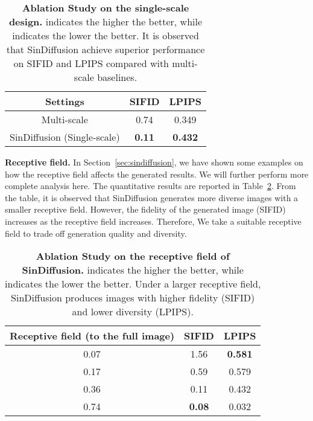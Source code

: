 \documentclass[10pt,twocolumn,letterpaper]{article}
\begin{document}
\begin{table}[t]
    \footnotesize
    \centering
    \begin{tabular}{c @{\hskip 14mm} c @{\hskip 14mm} c}
    \toprule
    \textbf{Settings} & \textbf{SIFID}  & \textbf{LPIPS}  \\
    \midrule
    {Multi-scale} & 0.74 & 0.349 \\
    {SinDiffusion (Single-scale)} & \textbf{0.11} & \textbf{0.432} \\
    \bottomrule
    \end{tabular}
    \vspace{-3mm}
    \caption{\textbf{Ablation Study on the single-scale design.}
     indicates the higher the better, while  indicates the lower the better.
    It is observed that SinDiffusion achieve superior performance on SIFID and LPIPS compared with multi-scale baselines. 
    }
    \vspace{-3mm}
    \label{tab:multiscale}
\end{table}

\noindent \textbf{Receptive field.}
In Section~\ref{sec:sindiffusion}, we have shown some examples on how the receptive field affects the generated results.
We will further perform more complete analysis here.
The quantitative results are reported in Table~\ref{tab:receptive}.
From the table, it is observed that SinDiffusion generates more diverse images with a smaller receptive field.
However, the fidelity of the generated image (SIFID) increases as the receptive field increases.
Therefore, We take a suitable receptive field to trade off generation quality and diversity.

\begin{table}[t]
    \footnotesize
    \centering
    \begin{tabular}{c @{\hskip 4mm} c @{\hskip 14mm} c}
    \toprule
    \textbf{Receptive field (to the full image)} & \textbf{SIFID}  & \textbf{LPIPS}  \\
    \midrule
    {0.07} & 1.56 & \textbf{0.581} \\
    {0.17} & 0.59 & 0.579 \\
    {0.36} & 0.11 & 0.432 \\
    {0.74} & \textbf{0.08} & 0.032 \\
    \bottomrule
    \end{tabular}
    \vspace{-3mm}
    \caption{\textbf{Ablation Study on the receptive field of SinDiffusion.}
     indicates the higher the better, while  indicates the lower the better.
    Under a larger receptive field, SinDiffusion produces images with higher fidelity (SIFID) and lower diversity (LPIPS). 
    }
    \vspace{-6mm}
    \label{tab:receptive}
\end{table}
\end{document}
